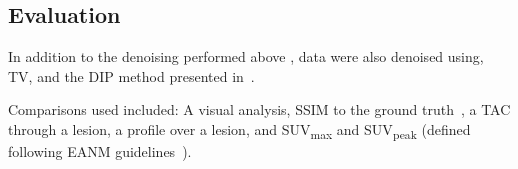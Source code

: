     
    \subsection{Evaluation} \label{sec:evaluation}
        In addition to the denoising performed above%
        , data were also denoised using, \gls{TV}, and the \gls{DIP} method presented in~\cite{Gong2019PETPrior}.
        
        Comparisons used included: A visual analysis, \gls{SSIM} to the ground truth~\cite{Wang2009MeanMeasures}, a \gls{TAC} through a lesion, a profile over a lesion, and \gls{SUV}\textsubscript{max} and \gls{SUV}\textsubscript{peak} (defined following \gls{EANM} guidelines~\cite{Boellaard2015FDG2.0}).


